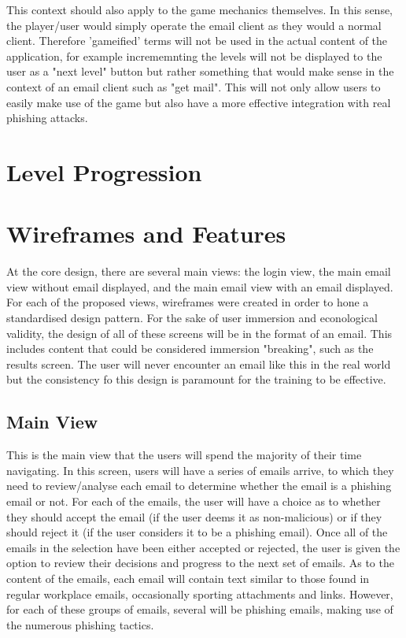 \documentclass{l4proj}
\begin{document}
This context should also apply to the game mechanics themselves. In this sense, the player/user would simply operate the email client as they would a normal client. Therefore 'gameified' terms will not be used in the actual content of the application, for example incrememnting the levels will not be displayed to the user as a "next level" button but rather something that would make sense in the context of an email client such as "get mail". This will not only allow users to easily make use of the game but also have a more effective integration with real phishing attacks.

\section{Level Progression}



\section{Wireframes and Features}
At the core design, there are several main views: the login view, the main email view without email displayed, and the main email view with an email displayed. For each of the proposed views, wireframes were created in order to hone a standardised design pattern. For the sake of user immersion and econological validity, the design of all of these screens will be in the format of an email. This includes content that could be considered immersion "breaking", such as the results screen. The user will never encounter an email like this in the real world but the consistency fo this design is paramount for the training to be effective. 


\subsection{Main View}

This is the main view that the users will spend the majority of their time navigating. In this screen, users will have a series of emails arrive, to which they need to review/analyse each email to determine whether the email is a phishing email or not. For each of the emails, the user will have a choice as to whether they should accept the email (if the user deems it as non-malicious) or if they should reject it (if the user considers it to be a phishing email). Once all of the emails in the selection have been either accepted or rejected, the user is given the option to review their decisions and progress to the next set of emails. As to the content of the emails, each email will contain text similar to those found in regular workplace emails, occasionally sporting attachments and links. However, for each of these groups of emails, several will be phishing emails, making use of the numerous phishing tactics.
\end{document}
